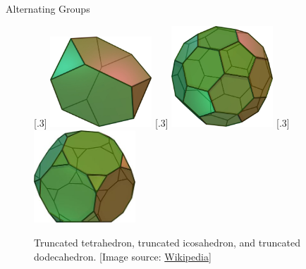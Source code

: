 \begin{section}{Alternating Groups}
\begin{figure}[!ht]
\begin{center}
\subcaptionbox{\label{fig:TruncatedTetrahedron}}[.3\textwidth]{
\includegraphics[width=1.5in]{TruncatedTetrahedron}
}
\subcaptionbox{\label{fig:TruncatedIcosahedron}}[.3\textwidth]{
\includegraphics[width=1.5in]{TruncatedIcosahedron}}
\subcaptionbox{\label{fig:TruncatedDodecahedron}}[.3\textwidth]{
\includegraphics[width=1.5in]{TruncatedDodecahedron}}
\caption{Truncated tetrahedron, truncated icosahedron, and truncated dodecahedron. [Image source: \href{https://en.wikipedia.org/wiki/Truncated_tetrahedron}{Wikipedia}]}
\end{center}
\end{figure}

\end{section}